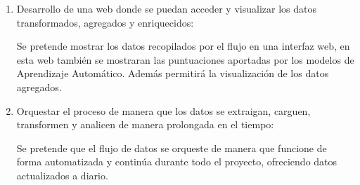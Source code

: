 \begin{enumerate}
\item Desarrollo de una web donde se puedan acceder y visualizar los datos transformados, agregados y enriquecidos:

Se pretende mostrar los datos recopilados por el flujo en una interfaz web, en esta web también se mostraran las puntuaciones aportadas por los modelos de Aprendizaje Automático. Además permitirá la visualización de los datos agregados.

\item Orquestar el proceso de manera que los datos se extraigan, carguen, transformen y analicen de manera prolongada en el tiempo:

Se pretende que el flujo de datos se orqueste de manera que funcione de forma automatizada y continúa durante todo el proyecto, ofreciendo datos actualizados a diario.

\end{enumerate}